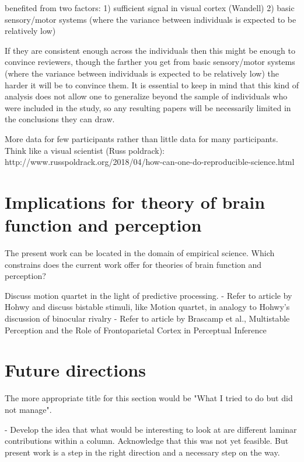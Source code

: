 benefited from two factors:
1) sufficient signal in visual cortex (Wandell)
2) basic sensory/motor systems (where the variance between individuals is expected to be relatively low)

If they are consistent enough across the individuals then this might be enough to convince reviewers, though the farther you get from basic sensory/motor systems (where the variance between individuals is expected to be relatively low) the harder it will be to convince them. It is essential to keep in mind that this kind of analysis does not allow one to generalize beyond the sample of individuals who were included in the study, so any resulting papers will be necessarily limited in the conclusions they can draw. 

More data for few participants rather than little data for many participants.
Think like a visual scientist (Russ poldrack):
http://www.russpoldrack.org/2018/04/how-can-one-do-reproducible-science.html




\section{Implications for theory of brain function and perception}
The present work can be located in the domain of empirical science. Which constrains does the current work offer for theories of brain function and perception? 

Discuss motion quartet in the light of predictive processing.
- Refer to article by Hohwy and discuss bistable stimuli, like Motion quartet, in analogy to Hohwy's discussion of binocular rivalry
- Refer to article by Brascamp et al., Multistable Perception and the Role of Frontoparietal Cortex in Perceptual Inference


\section{Future directions}
The more appropriate title for this section would be "What I tried to do but did not manage".

- Develop the idea that what would be interesting to look at are different laminar contributions within a column. Acknowledge that this was not yet feasible. But present work is a step in the right direction and a necessary step on the way.
